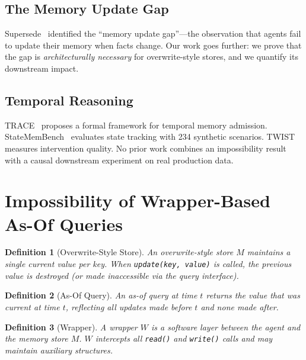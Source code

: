 \documentclass{article}
\newtheorem{definition}{Definition}
\begin{document}
\subsection{The Memory Update Gap}
Supersede~\citep{supersede} identified the ``memory update gap''---the observation that agents fail to update their memory when facts change. Our work goes further: we prove that the gap is \emph{architecturally necessary} for overwrite-style stores, and we quantify its downstream impact.

\subsection{Temporal Reasoning}
TRACE~\citep{trace} proposes a formal framework for temporal memory admission. StateMemBench~\citep{statemem} evaluates state tracking with 234 synthetic scenarios. TWIST~\citep{twist} measures intervention quality. No prior work combines an impossibility result with a causal downstream experiment on real production data.

\section{Impossibility of Wrapper-Based As-Of Queries}
\label{sec:theory}

\begin{definition}[Overwrite-Style Store]
An \emph{overwrite-style store} $M$ maintains a single current value per key. When \texttt{update(key, value)} is called, the previous value is destroyed (or made inaccessible via the query interface).
\end{definition}

\begin{definition}[As-Of Query]
An \emph{as-of query} at time $t$ returns the value that was current at time $t$, reflecting all updates made before $t$ and none made after.
\end{definition}

\begin{definition}[Wrapper]
A \emph{wrapper} $W$ is a software layer between the agent and the memory store $M$. $W$ intercepts all \texttt{read()} and \texttt{write()} calls and may maintain auxiliary structures.
\end{definition}
\end{document}
